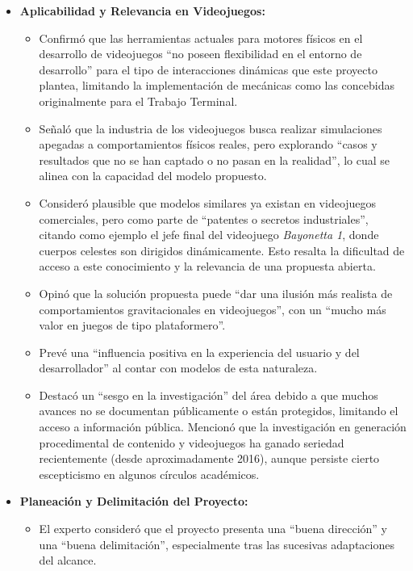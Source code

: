 \begin{itemize}
    \item \textbf{Aplicabilidad y Relevancia en Videojuegos:}
    \begin{itemize}
        \item Confirmó que las herramientas actuales para motores físicos en el desarrollo de videojuegos ``no poseen flexibilidad en el entorno de desarrollo'' para el tipo de interacciones dinámicas que este proyecto plantea, limitando la implementación de mecánicas como las concebidas originalmente para el Trabajo Terminal.
        \item Señaló que la industria de los videojuegos busca realizar simulaciones apegadas a comportamientos físicos reales, pero explorando ``casos y resultados que no se han captado o no pasan en la realidad'', lo cual se alinea con la capacidad del modelo propuesto.
        \item Consideró plausible que modelos similares ya existan en videojuegos comerciales, pero como parte de ``patentes o secretos industriales'', citando como ejemplo el jefe final del videojuego \textit{Bayonetta 1}, donde cuerpos celestes son dirigidos dinámicamente. Esto resalta la dificultad de acceso a este conocimiento y la relevancia de una propuesta abierta.
        \item Opinó que la solución propuesta puede ``dar una ilusión más realista de comportamientos gravitacionales en videojuegos'', con un ``mucho más valor en juegos de tipo plataformero''.
        \item Prevé una ``influencia positiva en la experiencia del usuario y del desarrollador'' al contar con modelos de esta naturaleza.
        \item Destacó un ``sesgo en la investigación'' del área debido a que muchos avances no se documentan públicamente o están protegidos, limitando el acceso a información pública. Mencionó que la investigación en generación procedimental de contenido y videojuegos ha ganado seriedad recientemente (desde aproximadamente 2016), aunque persiste cierto escepticismo en algunos círculos académicos.
    \end{itemize}

    \item \textbf{Planeación y Delimitación del Proyecto:}
    \begin{itemize}
        \item El experto consideró que el proyecto presenta una ``buena dirección'' y una ``buena delimitación'', especialmente tras las sucesivas adaptaciones del alcance.
    \end{itemize}


\end{itemize}
